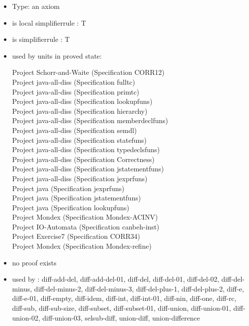 \documentclass[a4paper]{article}
\begin{document}
\begin{itemize}

\item Type: an axiom

\item is local simplifierrule : T
\item is simplifierrule : T
\item used by units in proved state:

Project Schorr-and-Waite (Specification CORR12) \\
Project java-all-diss (Specification fulltc) \\
Project java-all-diss (Specification primtc) \\
Project java-all-diss (Specification lookupfuns) \\
Project java-all-diss (Specification hierarchy) \\
Project java-all-diss (Specification memberdeclfuns) \\
Project java-all-diss (Specification semdl) \\
Project java-all-diss (Specification statefuns) \\
Project java-all-diss (Specification typedeclsfuns) \\
Project java-all-diss (Specification Correctness) \\
Project java-all-diss (Specification jstatementfuns) \\
Project java-all-diss (Specification jexprfuns) \\
Project java (Specification jexprfuns) \\
Project java (Specification jstatementfuns) \\
Project java (Specification lookupfuns) \\
Project Mondex (Specification Mondex-ACINV) \\
Project IO-Automata (Specification canbeh-inst) \\
Project Exercise7 (Specification CORR34) \\
Project Mondex (Specification Mondex-refine)
\item       no proof exists
\item       used by      : diff-add-del, diff-add-del-01, diff-del, diff-del-01, diff-del-02, diff-del-minus, diff-del-minus-2, diff-del-minus-3, diff-del-plus-1, diff-del-plus-2, diff-e, diff-e-01, diff-empty, diff-idem, diff-int, diff-int-01, diff-nin, diff-one, diff-rc, diff-sub, diff-sub-size, diff-subset, diff-subset-01, diff-union, diff-union-01, diff-union-02, diff-union-03, selsub-diff, union-diff, union-difference
\end{itemize}
\end{document}
